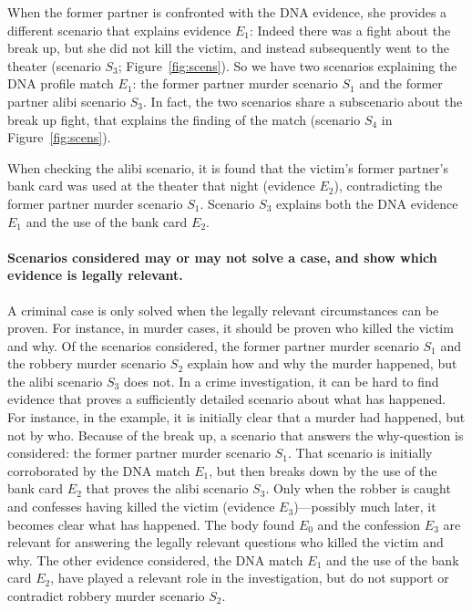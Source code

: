 \documentclass[10pt]{article}
\begin{document}
When the former partner is confronted with the DNA evidence, she provides a different scenario that explains evidence $E_1$: Indeed there was a fight about the break up, but she did not kill the victim, and instead subsequently went to the theater (scenario $S_3$; Figure~\ref{fig:scens}). So we have two scenarios explaining the DNA profile match $E_1$: the former partner murder scenario $S_1$ and the former partner alibi scenario $S_3$. In fact, the two scenarios share a subscenario about the break up fight, that explains the finding of the match (scenario $S_4$ in Figure~\ref{fig:scens}).

When checking the alibi scenario, it is found that the victim's former partner's bank card was used at the theater that night (evidence $E_2$), contradicting the former partner murder scenario $S_1$. Scenario $S_3$ explains both the DNA evidence $E_1$ and the use of the bank card $E_2$. 

\paragraph{Scenarios considered may or may not solve a case, and show which evidence is legally relevant.} A criminal case is only solved when the legally relevant circumstances can be proven. For instance, in murder cases, it should be proven who killed the victim and why. Of the scenarios considered, the former partner murder scenario $S_1$ and the robbery murder scenario $S_2$ explain how and why the murder happened, but the alibi scenario $S_3$ does not. In a crime investigation, it can be hard to find evidence that proves a sufficiently detailed scenario about what has happened. For instance, in the example, it is initially clear that a murder had happened, but not by who. Because of the break up, a scenario that answers the why-question is considered: the former partner murder scenario $S_1$. That scenario is initially corroborated by the DNA match $E_1$, but then breaks down by the use of the bank card $E_2$ that proves the alibi scenario $S_3$. Only when the robber is caught and confesses having killed the victim (evidence $E_3$)---possibly much later, it becomes clear what has happened. The body found $E_0$ and the confession $E_3$ are relevant for answering the legally relevant questions who killed the victim and why. The other evidence considered, the DNA match $E_1$ and the use of the bank card $E_2$, have played a relevant role in the investigation, but do not support or contradict robbery murder scenario $S_2$. 
\end{document}
